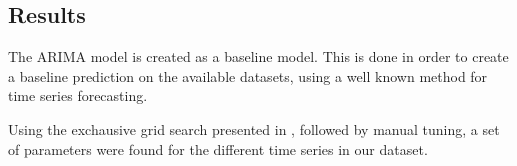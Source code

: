 



\subsection{Results}
The ARIMA model is created as a baseline model.
This is done in order to create a baseline prediction on the available datasets, using a well known method for time series forecasting.

Using the exchausive grid search presented in , followed by manual tuning,
a set of parameters were found for the different time series in our dataset.







